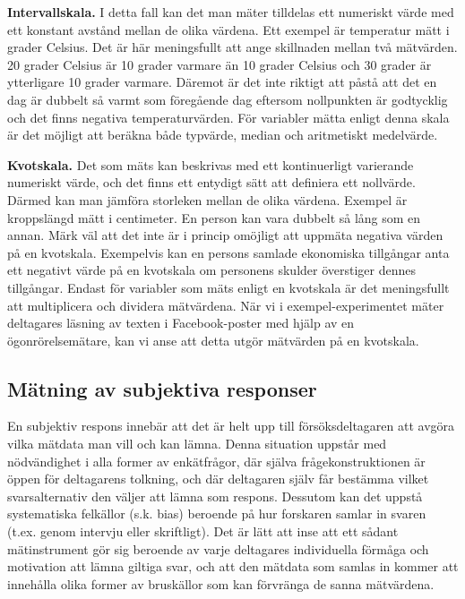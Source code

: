 \documentclass[
]{book}
\begin{document}
\textbf{Intervallskala.} I detta fall kan det man mäter tilldelas ett numeriskt värde med ett konstant avstånd mellan de olika värdena. Ett exempel är temperatur mätt i grader Celsius. Det är här meningsfullt att ange skillnaden mellan två mätvärden. 20 grader Celsius är 10 grader varmare än 10 grader Celsius och 30 grader är ytterligare 10 grader varmare. Däremot är det inte riktigt att påstå att det en dag är dubbelt så varmt som föregående dag eftersom nollpunkten är godtycklig och det finns negativa temperaturvärden. För variabler mätta enligt denna skala är det möjligt att beräkna både typvärde, median och aritmetiskt medelvärde.

\textbf{Kvotskala.} Det som mäts kan beskrivas med ett kontinuerligt varierande numeriskt värde, och det finns ett entydigt sätt att definiera ett nollvärde. Därmed kan man jämföra storleken mellan de olika värdena. Exempel är kroppslängd mätt i centimeter. En person kan vara dubbelt så lång som en annan. Märk väl att det inte är i princip omöjligt att uppmäta negativa värden på en kvotskala. Exempelvis kan en persons samlade ekonomiska tillgångar anta ett negativt värde på en kvotskala om personens skulder överstiger dennes tillgångar. Endast för variabler som mäts enligt en kvotskala är det meningsfullt att multiplicera och dividera mätvärdena. När vi i exempel-experimentet mäter deltagares läsning av texten i Facebook-poster med hjälp av en ögonrörelsemätare, kan vi anse att detta utgör mätvärden på en kvotskala.

\hypertarget{sub07.3.2}{%
\subsection{Mätning av subjektiva responser}\label{sub07.3.2}}

En subjektiv respons innebär att det är helt upp till försöksdeltagaren att avgöra vilka mätdata man vill och kan lämna. Denna situation uppstår med nödvändighet i alla former av enkätfrågor, där själva frågekonstruktionen är öppen för deltagarens tolkning, och där deltagaren själv får bestämma vilket svarsalternativ den väljer att lämna som respons. Dessutom kan det uppstå systematiska felkällor (s.k. bias) beroende på hur forskaren samlar in svaren (t.ex. genom intervju eller skriftligt). Det är lätt att inse att ett sådant mätinstrument gör sig beroende av varje deltagares individuella förmåga och motivation att lämna giltiga svar, och att den mätdata som samlas in kommer att innehålla olika former av bruskällor som kan förvränga de sanna mätvärdena.
\end{document}
